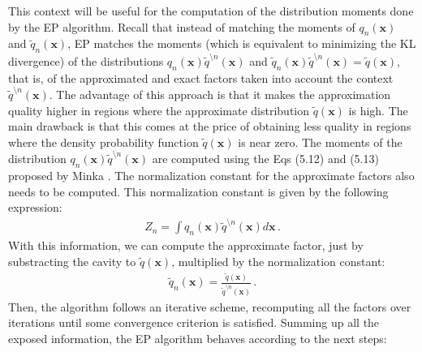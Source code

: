 \documentclass[review,preprint,12pt]{elsarticle}
\begin{document}
This context will be useful for the computation of the distribution moments done by the EP algorithm. Recall that instead of matching the moments of $q_n(\boldsymbol{x})$ and $\tilde{q}_n(\boldsymbol{x})$, EP matches the moments (which is equivalent to minimizing the KL divergence) of the distributions $q_n(\boldsymbol{x})\tilde{q}^{\setminus n}(\boldsymbol{x})$ and $\tilde{q}_n(\boldsymbol{x})\tilde{q}^{\setminus n}(\boldsymbol{x}) = \tilde{q}(\boldsymbol{x})$, that is, of the approximated and exact factors taken into account the context $\tilde{q}^{\setminus n}(\boldsymbol{x})$. The advantage of this approach is that it makes the approximation quality higher in regions where the approximate distribution $\tilde{q}(\boldsymbol{x})$ is high. The main drawback is that this comes at the price of obtaining less quality in regions where the density probability function $\tilde{q}(\boldsymbol{x})$ is near zero. The moments of the distribution $q_n(\boldsymbol{x})\tilde{q}^{\setminus n}(\boldsymbol{x})$ are computed using the Eqs (5.12) and (5.13) proposed by Minka \citep{minka2001expectation}. The normalization constant for the approximate factors also needs to be computed. This normalization constant is given by the following expression:
\begin{align}
Z_n = \int q_n(\boldsymbol{x})\tilde{q}^{\setminus n}(\boldsymbol{x}) d\boldsymbol{x}\,.
\end{align}
With this information, we can compute the approximate factor, just by substracting the cavity to $\tilde{q}(\boldsymbol{x})$, multiplied by the normalization constant:
\begin{align}
\tilde{q}_n(\boldsymbol{x}) = \frac{\tilde{q}(\boldsymbol{x})}{\tilde{q}^{\setminus n}(\boldsymbol{x})}\,.
\end{align}
Then, the algorithm follows an iterative scheme, recomputing all the factors over iterations until some convergence criterion is satisfied. Summing up all the exposed information, the EP algorithm behaves according to the next steps:
\end{document}
